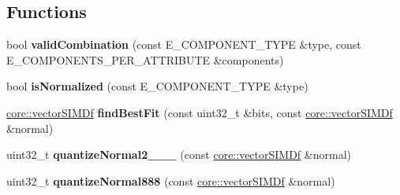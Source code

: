 \subsection*{Functions}
\begin{DoxyCompactItemize}
\item 
bool {\bfseries valid\+Combination} (const E\+\_\+\+C\+O\+M\+P\+O\+N\+E\+N\+T\+\_\+\+T\+Y\+PE \&type, const E\+\_\+\+C\+O\+M\+P\+O\+N\+E\+N\+T\+S\+\_\+\+P\+E\+R\+\_\+\+A\+T\+T\+R\+I\+B\+U\+TE \&components)\hypertarget{namespaceirr_1_1scene_a02d88a64f0f3b254ccec14832aaff0b2}{}\label{namespaceirr_1_1scene_a02d88a64f0f3b254ccec14832aaff0b2}

\item 
bool {\bfseries is\+Normalized} (const E\+\_\+\+C\+O\+M\+P\+O\+N\+E\+N\+T\+\_\+\+T\+Y\+PE \&type)\hypertarget{namespaceirr_1_1scene_acf9d7b38e4aa252b86fedaf426105230}{}\label{namespaceirr_1_1scene_acf9d7b38e4aa252b86fedaf426105230}

\item 
\hyperlink{classirr_1_1core_1_1vectorSIMDf}{core\+::vector\+S\+I\+M\+Df} {\bfseries find\+Best\+Fit} (const uint32\+\_\+t \&bits, const \hyperlink{classirr_1_1core_1_1vectorSIMDf}{core\+::vector\+S\+I\+M\+Df} \&normal)\hypertarget{namespaceirr_1_1scene_a2d16f659e6c5f36de18ae39f507ba2d3}{}\label{namespaceirr_1_1scene_a2d16f659e6c5f36de18ae39f507ba2d3}

\item 
uint32\+\_\+t {\bfseries quantize\+Normal2\+\_\+\_\+\_} (const \hyperlink{classirr_1_1core_1_1vectorSIMDf}{core\+::vector\+S\+I\+M\+Df} \&normal)\hypertarget{namespaceirr_1_1scene_a57a9aa71f1850225eef12ba61c4fc517}{}\label{namespaceirr_1_1scene_a57a9aa71f1850225eef12ba61c4fc517}

\item 
uint32\+\_\+t {\bfseries quantize\+Normal888} (const \hyperlink{classirr_1_1core_1_1vectorSIMDf}{core\+::vector\+S\+I\+M\+Df} \&normal)\hypertarget{namespaceirr_1_1scene_ade7efb5bc1d81fd05192b99db1d3e420}{}\label{namespaceirr_1_1scene_ade7efb5bc1d81fd05192b99db1d3e420}

\end{DoxyCompactItemize}
